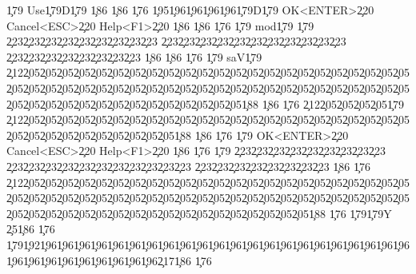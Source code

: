  \c{179} Use\c{179}D\c{179}                                                             \c{186} \c{186}      \c{176}
 \c{195}\c{196}\c{196}\c{196}\c{196}\c{179}D\c{179}              OK<ENTER>\c{220} Cancel<ESC>\c{220} Help<F1>\c{220}              \c{186} \c{186}      \c{176}
 \c{179} mod\c{179} \c{179}               \c{223}\c{223}\c{223}\c{223}\c{223}\c{223}\c{223}\c{223}\c{223}  \c{223}\c{223}\c{223}\c{223}\c{223}\c{223}\c{223}\c{223}\c{223}\c{223}\c{223}  \c{223}\c{223}\c{223}\c{223}\c{223}\c{223}\c{223}\c{223}              \c{186} \c{186}      \c{176}
 \c{179} saV\c{179} \c{212}\c{205}\c{205}\c{205}\c{205}\c{205}\c{205}\c{205}\c{205}\c{205}\c{205}\c{205}\c{205}\c{205}\c{205}\c{205}\c{205}\c{205}\c{205}\c{205}\c{205}\c{205}\c{205}\c{205}\c{205}\c{205}\c{205}\c{205}\c{205}\c{205}\c{205}\c{205}\c{205}\c{205}\c{205}\c{205}\c{205}\c{205}\c{205}\c{205}\c{205}\c{205}\c{205}\c{205}\c{205}\c{205}\c{205}\c{205}\c{205}\c{205}\c{205}\c{205}\c{205}\c{205}\c{205}\c{205}\c{205}\c{205}\c{205}\c{205}\c{205}\c{205}\c{188} \c{186}      \c{176}
 \c{212}\c{205}\c{205}\c{205}\c{205}\c{179}               \c{212}\c{205}\c{205}\c{205}\c{205}\c{205}\c{205}\c{205}\c{205}\c{205}\c{205}\c{205}\c{205}\c{205}\c{205}\c{205}\c{205}\c{205}\c{205}\c{205}\c{205}\c{205}\c{205}\c{205}\c{205}\c{205}\c{205}\c{205}\c{205}\c{205}\c{205}\c{205}\c{205}\c{205}\c{188}               \c{186}      \c{176}
      \c{179}                OK<ENTER>\c{220} Cancel<ESC>\c{220} Help<F1>\c{220}                \c{186}      \c{176}
      \c{179}                 \c{223}\c{223}\c{223}\c{223}\c{223}\c{223}\c{223}\c{223}\c{223}  \c{223}\c{223}\c{223}\c{223}\c{223}\c{223}\c{223}\c{223}\c{223}\c{223}\c{223}  \c{223}\c{223}\c{223}\c{223}\c{223}\c{223}\c{223}\c{223}                \c{186}      \c{176}
      \c{212}\c{205}\c{205}\c{205}\c{205}\c{205}\c{205}\c{205}\c{205}\c{205}\c{205}\c{205}\c{205}\c{205}\c{205}\c{205}\c{205}\c{205}\c{205}\c{205}\c{205}\c{205}\c{205}\c{205}\c{205}\c{205}\c{205}\c{205}\c{205}\c{205}\c{205}\c{205}\c{205}\c{205}\c{205}\c{205}\c{205}\c{205}\c{205}\c{205}\c{205}\c{205}\c{205}\c{205}\c{205}\c{205}\c{205}\c{205}\c{205}\c{205}\c{205}\c{205}\c{205}\c{205}\c{205}\c{205}\c{205}\c{205}\c{205}\c{205}\c{205}\c{205}\c{205}\c{205}\c{205}\c{205}\c{188}      \c{176}
                      \c{179}\c{179}Y                              \c{25}\c{186}                      \c{176}
                      \c{179}\c{192}\c{196}\c{196}\c{196}\c{196}\c{196}\c{196}\c{196}\c{196}\c{196}\c{196}\c{196}\c{196}\c{196}\c{196}\c{196}\c{196}\c{196}\c{196}\c{196}\c{196}\c{196}\c{196}\c{196}\c{196}\c{196}\c{196}\c{196}\c{196}\c{196}\c{196}\c{196}\c{217}\c{186}                      \c{176}
